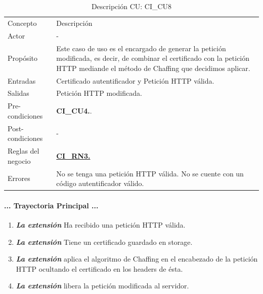 \documentclass[12pt, a4paper, titlepage]{report}
\begin{document}
				\newpage
			    \begin{table}[H]
    				\begin{tabular}{ |p{3.5cm}||p{9.5cm}|}
    					\hline
    					\rowcolor{guindapoli}  					\multicolumn{2}{|c|}{\textbf{\textcolor{white}{Caso de uso: CI\_CU8. Generación de Chaffing}}}\\
    					\hline
    					\rowcolor{azulfuerte}Concepto & Descripción\\
    					\hline
    					\cellcolor{azulclaro}Actor & 
    					-\\ 
    					\hline
    					\cellcolor{azulclaro}Propósito &
    					Este caso de uso es el encargado de generar la petición modificada, es decir, de combinar el certificado con la petición HTTP mediande el método de Chaffing que decidimos aplicar.\\
    					\hline
    					\cellcolor{azulclaro}Entradas &
    					Certificado autentificador y Petición HTTP válida.\\
    					\hline
    					\cellcolor{azulclaro}Salidas &
    					Petición HTTP modificada.\\
    					\hline
    					\cellcolor{azulclaro}Pre-condiciones&
    					\textbf{{CI\_CU4.}}. \\
    					\hline
    					\cellcolor{azulclaro}Post-condiciones&
    					-\\
    					\hline
    					\cellcolor{azulclaro}Reglas del negocio&
    					\hyperref[CI_RN3]{\textbf{CI\_RN3.}}\\
    					\hline
    					\cellcolor{azulclaro}Errores &
    				    No se tenga una petición HTTP válida. No se cuente con un c\'odigo autentificador válido.\\
    					\hline
    				\end{tabular}
				\caption[DCU: CI\_CU8]{Descripción CU: CI\_CU8}
				\end{table}
				
				\paragraph{... Trayectoria Principal ...}
				\begin{enumerate}
				    \item \textbf{\textit{La extensión}} Ha recibido una petición HTTP válida.
				    \item \textbf{\textit{La extensión}} Tiene un certificado guardado en storage.
				    \item \textbf{\textit{La extensión}} aplica el algoritmo de Chaffing en el encabezado de la petición HTTP ocultando el certificado en los headers de ésta.
				    \item \textbf{\textit{La extensión}} libera la petición modificada al servidor.
				\end{enumerate}
\end{document}
